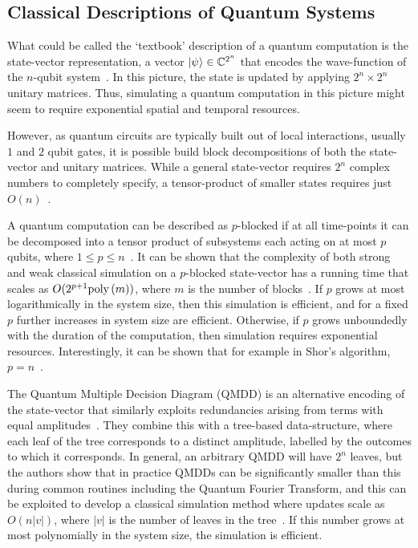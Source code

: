 \subsection{Classical Descriptions of Quantum Systems}\label{sec:intro_classical_desc}
What could be called the `textbook' description of a quantum computation is the state-vector representation, a vector $\ket{\psi}\in\mathbb{C}^{2^{n}}$ that encodes the wave-function of the $n$-qubit system~\cite{Nielsen2000}. In this picture, the state is updated by applying $2^{n}\times 2^{n}$ unitary matrices. Thus, simulating a quantum computation in this picture might seem to require exponential spatial and temporal resources.\par
However, as quantum circuits are typically built out of local interactions, usually $1$ and $2$ qubit gates, it is possible build block decompositions of both the state-vector and unitary matrices. While a general state-vector requires $2^{n}$ complex numbers to completely specify, a tensor-product of smaller states requires just $O\left(n\right)$~\cite{Ekert1998}.\par
A quantum computation can be described as $p$-blocked if at all time-points it can be decomposed into a tensor product of subsystems each acting on at most $p$ qubits, where $1\leq p\leq n$~\cite{Jozsa2003}. It can be shown that the complexity of both strong and weak classical simulation on a $p$-blocked state-vector has a running time that scales as $O(2^{p+1}\text{poly}\left(m\right))$, where $m$ is the number of blocks~\cite{Jozsa2003}. If $p$ grows at most logarithmically in the system size, then this simulation is efficient, and for a fixed $p$ further increases in system size are efficient. Otherwise, if $p$ grows unboundedly with the duration of the computation, then simulation requires exponential resources. Interestingly, it can be shown that for example in Shor's algorithm, $p=n$~\cite{Ekert1998}.\par
The Quantum Multiple Decision Diagram (QMDD) is an alternative encoding of the state-vector that similarly exploits redundancies arising from terms with equal amplitudes~\cite{Niemann2016}. They combine this with a tree-based data-structure, where each leaf of the tree corresponds to a distinct amplitude, labelled by the outcomes to which it corresponds. In general, an arbitrary QMDD will have $2^{n}$ leaves, but the authors show that in practice QMDDs can be significantly smaller than this during common routines including the Quantum Fourier Transform, and this can be exploited to develop a classical simulation method where updates scale as $O\left(n \left|v\right|\right)$, where $\left|v\right|$ is the number of leaves in the tree~\cite{Zulehner2017}. If this number grows at most polynomially in the system size, the simulation is efficient.\par
